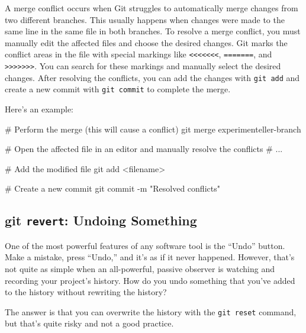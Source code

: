 \documentclass[
  letterpaper,
  DIV=11,
  numbers=noendperiod]{scrreprt}
\newenvironment{Shaded}{\begin{snugshade}}{\end{snugshade}}
\newcommand{\AttributeTok}[1]{\textcolor[rgb]{0.40,0.45,0.13}{#1}}
\newcommand{\CommentTok}[1]{\textcolor[rgb]{0.37,0.37,0.37}{#1}}
\newcommand{\FunctionTok}[1]{\textcolor[rgb]{0.28,0.35,0.67}{#1}}
\newcommand{\NormalTok}[1]{\textcolor[rgb]{0.00,0.23,0.31}{#1}}
\newcommand{\OperatorTok}[1]{\textcolor[rgb]{0.37,0.37,0.37}{#1}}
\newcommand{\StringTok}[1]{\textcolor[rgb]{0.13,0.47,0.30}{#1}}
\begin{document}
A merge conflict occurs when Git struggles to automatically merge
changes from two different branches. This usually happens when changes
were made to the same line in the same file in both branches. To resolve
a merge conflict, you must manually edit the affected files and choose
the desired changes. Git marks the conflict areas in the file with
special markings like
\texttt{\textless{}\textless{}\textless{}\textless{}\textless{}\textless{}\textless{}},
\texttt{=======}, and
\texttt{\textgreater{}\textgreater{}\textgreater{}\textgreater{}\textgreater{}\textgreater{}\textgreater{}}.
You can search for these markings and manually select the desired
changes. After resolving the conflicts, you can add the changes with
\texttt{git\ add} and create a new commit with \texttt{git\ commit} to
complete the merge.

Here's an example:

\begin{Shaded}
\begin{Highlighting}[]
\CommentTok{\# Perform the merge (this will cause a conflict)}
\FunctionTok{git}\NormalTok{ merge experimenteller{-}branch}

\CommentTok{\# Open the affected file in an editor and manually resolve the conflicts}
\CommentTok{\# ...}

\CommentTok{\# Add the modified file}
\FunctionTok{git}\NormalTok{ add }\OperatorTok{\textless{}}\NormalTok{filename}\OperatorTok{\textgreater{}}

\CommentTok{\# Create a new commit}
\FunctionTok{git}\NormalTok{ commit }\AttributeTok{{-}m} \StringTok{"Resolved conflicts"}
\end{Highlighting}
\end{Shaded}

\hypertarget{git-revert-undoing-something}{%
\subsection{\texorpdfstring{git \texttt{revert}: Undoing
Something}{git revert: Undoing Something}}\label{git-revert-undoing-something}}

One of the most powerful features of any software tool is the ``Undo''
button. Make a mistake, press ``Undo,'' and it's as if it never
happened. However, that's not quite as simple when an all-powerful,
passive observer is watching and recording your project's history. How
do you undo something that you've added to the history without rewriting
the history?

The answer is that you can overwrite the history with the
\texttt{git\ reset} command, but that's quite risky and not a good
practice.
\end{document}
